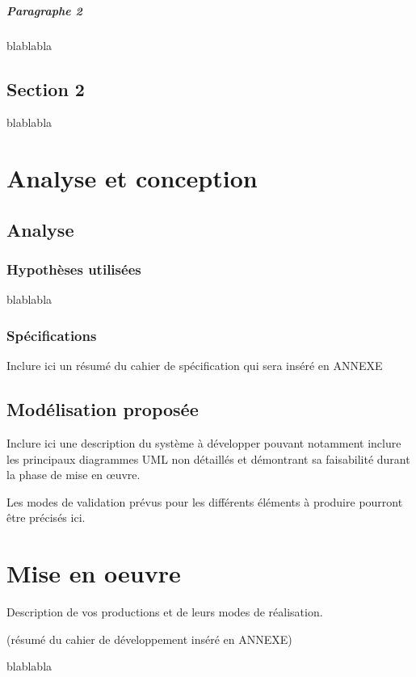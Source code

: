 \documentclass{polytech/polytech}
\numberwithin{figure}{chapter}
\begin{document}
\paragraph{Paragraphe 2}

blablabla

\section{Section 2}

blablabla


\chapter{Analyse et conception}

\section{Analyse}

\subsection{Hypothèses utilisées}
blablabla

\subsection{Spécifications}
Inclure ici un résumé du cahier de spécification qui sera inséré en ANNEXE

\section{Modélisation proposée}

Inclure ici une description du système à développer
pouvant notamment inclure les principaux diagrammes UML non détaillés
et démontrant sa faisabilité durant la phase de mise en œuvre.

Les modes de validation prévus pour les différents éléments à produire
pourront être précisés ici.

\chapter{Mise en oeuvre}

Description de vos productions et de leurs modes de réalisation.

(résumé du cahier de développement inséré en ANNEXE)

blablabla
\end{document}
